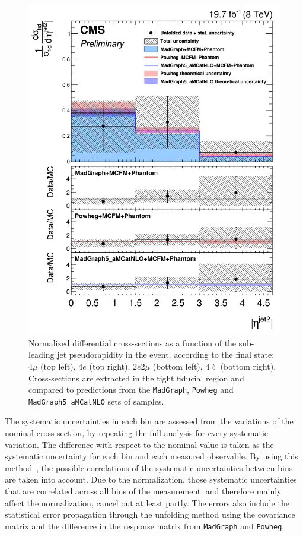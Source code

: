 \begin{figure}[hbtp]
\begin{center}
    \includegraphics[width=\cmsFigWidth]{Figures/DiffCrossSecZZTo4lEtaJet2_Unfolded_fr_MadGraph_norm.png}       
    \caption{\footnotesize{Normalized differential cross-sections as a function of the sub-leading jet pseudorapidity in the event, according to the final state: $4\mu$ (top left), $4e$ (top right), $2e2\mu$  (bottom left),  $4\ell$ (bottom right). Cross-sections are extracted in the tight fiducial region and compared to predictions from the \texttt{MadGraph}, \texttt{Powheg}  and \texttt{MadGraph5\_aMCatNLO} sets of samples.}}  
    \label{fig:diff_xs_etajet2}
  \end{center}
\end{figure}
The systematic uncertainties in each bin are assessed from the variations of the nominal cross-section, by repeating the full analysis for every systematic variation. The difference with respect to the nominal value is taken as the systematic uncertainty for each bin and each measured observable. By using this method~\cite{SMP-14-016}, the possible correlations of the systematic uncertainties between bins are taken into account. Due to the normalization, those systematic uncertainties that are correlated across all bins of the measurement, and therefore mainly affect the normalization, cancel out at least partly. The errors also include the statistical error propagation through the unfolding method using the covariance matrix and the difference in the response matrix from \texttt{MadGraph} and \texttt{Powheg}.

